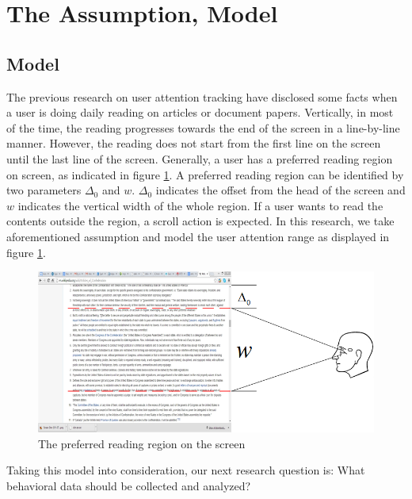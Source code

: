 \documentclass{sigchi}
\begin{document}
\section{The Assumption, Model }
\subsection{Model}

The previous research on user attention tracking \cite{buscher2010eye} have disclosed some facts when a user is doing daily reading on 
articles or document papers. Vertically, in most of the time, the reading progresses towards the end of the screen  in a line-by-line manner. 
However, the reading does not start from the first line on the screen until the last line of the screen. Generally, a user has a preferred reading region on screen,
as indicated in figure \ref{fig:read_region}. A preferred reading region can be identified by two parameters $\Delta_0$ and $w$. $\Delta_0$  indicates the 
offset from the head of the screen and $w$ indicates the vertical width of the whole region. If a user wants to read the contents outside the region,
a scroll action is expected. In this research, we take aforementioned assumption and model the user attention range as displayed in figure \ref{fig:read_region}. 



\begin{figure}[!h]
\centering
\includegraphics[width=1.0\columnwidth]{pictures/preferred_reigon}
\caption{The preferred reading region on the screen}
\label{fig:read_region}
\end{figure}



Taking this model into consideration, our next  research question is: 
What behavioral data should be collected and analyzed?
\end{document}
